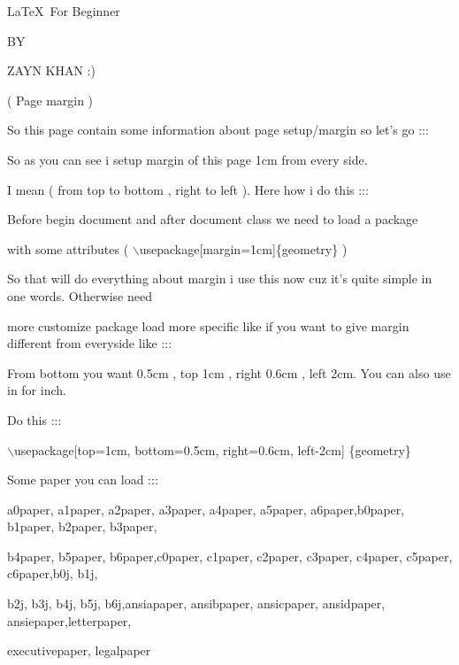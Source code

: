 \documentclass[12pt]{article}
\begin{document}
\begin{center}
\Large \LaTeX\ For Beginner

\small BY

\Large ZAYN KHAN :)

\large ( Page margin )
\end{center}

So this page contain some information about page setup/margin so let's go :::

\vspace{0.5cm}

So as you can see i setup margin of this page 1cm from every side.

I mean ( from top to bottom , right to left ). Here how i do this :::

\vspace{0.5cm}

Before begin document and after document class we need to load a package

with some attributes ( $\backslash$usepackage[margin=1cm]\{geometry\} )

So that will do everything about margin i use this now cuz it's quite simple in one words. Otherwise need

more customize package load more specific like if you want to give margin different from everyside like :::

\vspace{0.5cm}

From bottom you want 0.5cm , top 1cm , right 0.6cm , left 2cm. You can also use in for inch.

\vspace{0.5cm}

Do this :::

$\backslash$usepackage[top=1cm, bottom=0.5cm, right=0.6cm, left-2cm]
\{geometry\}

\vspace{0.5cm}

Some paper you can load :::

a0paper, a1paper, a2paper, a3paper, a4paper, a5paper, a6paper,b0paper, b1paper, b2paper, b3paper,

 b4paper, b5paper, b6paper,c0paper, c1paper, c2paper, c3paper, c4paper, c5paper, c6paper,b0j, b1j,
 
  b2j, b3j, b4j, b5j, b6j,ansiapaper, ansibpaper, ansicpaper, ansidpaper, ansiepaper,letterpaper,
  
   executivepaper, legalpaper

\vspace{0.5cm}
\end{document}
